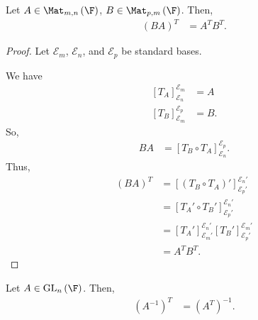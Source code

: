 \documentclass[10pt]{mypackage}
\begin{document}
\begin{lemma}
  Let $A\in \Mat_{m,n}\left(\F\right)$, $B\in \Mat_{p,m}\left(\F\right)$. Then,
  \begin{align*}
    \left(BA\right)^T &= A^TB^T.
  \end{align*}
\end{lemma}
\begin{proof}
  Let $\mathcal{E}_m$, $\mathcal{E}_n$, and $\mathcal{E}_p$ be standard bases.\newline

  We have
  \begin{align*}
    \left[T_A\right]_{\mathcal{E}_n}^{\mathcal{E}_m} &= A\\
    \left[T_B\right]_{\mathcal{E}_m}^{\mathcal{E}_p} &= B.
  \end{align*}
  So,
  \begin{align*}
    BA &= \left[T_B\circ T_A\right]_{\mathcal{E}_n}^{\mathcal{E}_p}.
  \end{align*}
  Thus,
  \begin{align*}
    \left(BA\right)^{T} &= \left[\left(T_B\circ T_A\right)'\right]_{\mathcal{E}_p'}^{\mathcal{E}_n'}\\
                        &= \left[T_A'\circ T_B'\right]_{\mathcal{E}_p'}^{\mathcal{E}_n'}\\
                        &= \left[T_A'\right]_{\mathcal{E}_m'}^{\mathcal{E}_n'}\left[T_{B}'\right]_{\mathcal{E}_p'}^{\mathcal{E}_m'}\\
                        &= A^TB^T.
  \end{align*}
\end{proof}
\begin{lemma}
  Let $A\in \text{GL}_{n}\left(\F\right)$. Then,
  \begin{align*}
    \left(A^{-1}\right)^{T} &= \left(A^{T}\right)^{-1}.
  \end{align*}
\end{lemma}
\end{document}
